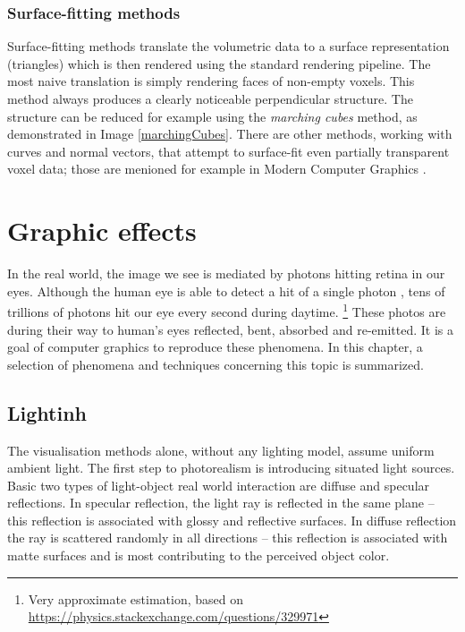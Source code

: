 \subsection{Surface-fitting methods}
Surface-fitting methods translate the volumetric data to a surface representation (triangles) which is then rendered using the standard rendering pipeline. The most naive translation is simply rendering faces of non-empty voxels. This method always produces a clearly noticeable perpendicular structure. The structure can be reduced for example using the \textit{marching cubes} method, as demonstrated in Image \ref{marchingCubes}. There are other methods, working with curves and normal vectors, that attempt to surface-fit even partially transparent voxel data; those are menioned for example in Modern Computer Graphics \cite{ZaraJiri2004Mpg}.


\chapter{Graphic effects} \label{ch:graphicEffects}
In the real world, the image we see is mediated by photons hitting retina in our eyes. Although the human eye is able to detect a hit of a single photon \cite{TinsleyJonathan2016Ddoa}, tens of trillions of photons hit our eye every second during daytime. \footnote{Very approximate estimation, based on \url{https://physics.stackexchange.com/questions/329971}} These photos are during their way to human's eyes reflected, bent, absorbed and re-emitted. It is a goal of computer graphics to reproduce these phenomena. In this chapter, a selection of phenomena and techniques concerning this topic is summarized.

\section{Lightinh} \label{lighting}
The visualisation methods alone, without any lighting model, assume uniform ambient light. The first step to photorealism is introducing situated light sources. Basic two types of light-object real world interaction are diffuse and specular reflections. In specular reflection, the light ray is reflected in the same plane -- this reflection is associated with glossy and reflective surfaces. In diffuse reflection the ray is scattered randomly in all directions -- this reflection is associated with matte surfaces and is most contributing to the perceived object color.


